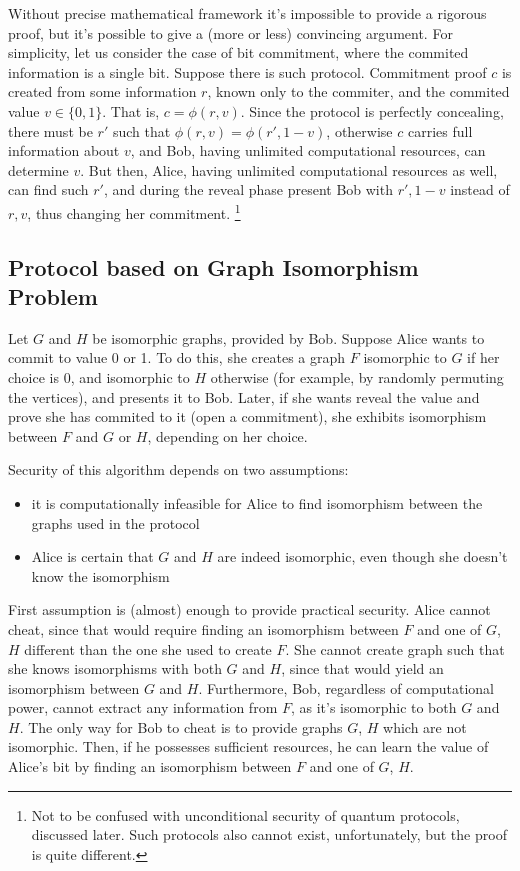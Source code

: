\documentclass[10pt]{article}
\begin{document}
Without precise mathematical framework it's impossible to provide a rigorous proof, but it's possible 
to give a (more or less) convincing argument. For simplicity, let us consider the case of bit 
commitment, where the commited information is a single bit. Suppose there is such protocol. Commitment 
proof \(c\) is created from some information \(r\), known only to the commiter, and the commited value 
\(v\in\{0,1\}\). That is, \(c=\phi(r,v)\). Since the protocol is perfectly concealing, there must
be \(r'\) such that \(\phi(r,v)=\phi(r',1-v)\), otherwise \(c\) carries full information about \(v\),
and Bob, having unlimited computational resources, can determine \(v\). But then, Alice, having 
unlimited computational resources as well, can find such \(r'\), and during the reveal phase present 
Bob with \(r', 1-v\) instead of \(r, v\), thus changing her commitment.
\footnote{Not to be confused with unconditional security of quantum protocols, discussed later.
Such protocols also cannot exist, unfortunately, but the proof is quite different.}

\subsection*{Protocol based on Graph Isomorphism Problem}

Let \(G\) and \(H\) be isomorphic graphs, provided by Bob. Suppose Alice wants to commit to value 0
or 1. To do this, she creates a graph \(F\) isomorphic to \(G\) if her choice is 0, and isomorphic 
to \(H\) otherwise (for example, by randomly permuting the vertices), and presents it to Bob. Later,
if she wants reveal the value and prove she has commited to it (open a commitment), she exhibits 
isomorphism between \(F\) and \(G\) or \(H\), depending on her choice.

Security of this algorithm depends on two assumptions:

\begin{itemize}
  \item it is computationally infeasible for Alice to find isomorphism between the graphs used in the
    protocol
  \item Alice is certain that \(G\) and \(H\) are indeed isomorphic, even though she doesn't know
    the isomorphism
\end{itemize}

First assumption is (almost) enough to provide practical security. Alice cannot cheat, since that would
require finding an isomorphism between \(F\) and one of \(G\), \(H\) different than the one she used to
create \(F\). She cannot create graph such that she knows isomorphisms with both \(G\) and \(H\), since
that would yield an isomorphism between \(G\) and \(H\). Furthermore, Bob, regardless of computational
power, cannot extract any information from \(F\), as it's isomorphic to both \(G\) and \(H\). The only 
way for Bob to cheat is to provide graphs \(G\), \(H\) which are not isomorphic. Then, if he possesses
sufficient resources, he can learn the value of Alice's bit by finding an isomorphism between \(F\) and
one of \(G\), \(H\).
\end{document}
